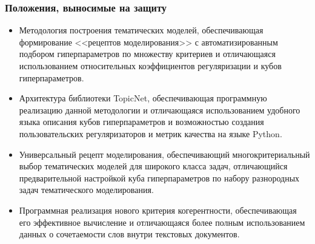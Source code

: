 \begin{frame}
    \frametitle{Положения, выносимые на защиту}
\small
    \begin{itemize}
\item
    Методология построения тематических моделей, обеспечивающая формирование <<рецептов моделирования>> с автоматизированным подбором гиперпараметров по множеству критериев и отличающаяся использованием относительных коэффициентов регуляризации и кубов гиперпараметров.
\item
    Архитектура библиотеки TopicNet, обеспечивающая программную реализацию данной методологии и отличающаяся использованием удобного языка описания кубов гиперпараметров и возможностью создания пользовательских регуляризаторов и метрик качества на языке Python.
\item
    Универсальный рецепт моделирования, обеспечивающий многокритериальный выбор тематических моделей для широкого класса задач, отличающийся предварительной настройкой куба гиперпараметров по набору разнородных задач тематического моделирования.
\item
    Программная реализация нового критерия когерентности, обеспечивающая его эффективное вычисление и отличающаяся более полным использованием данных о сочетаемости слов внутри текстовых документов.
    \end{itemize}

    
\end{frame}
